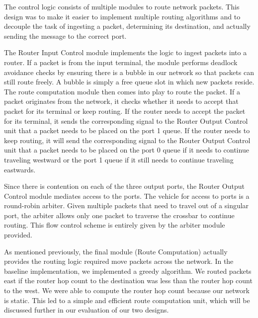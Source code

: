 \documentclass[10pt]{article}
\begin{document}
The control logic consists of multiple modules to route network packets.
This design was to make it easier to implement multiple routing algorithms
and to decouple the task of ingesting a packet, determining its destination,
and actually sending the message to the correct port. \par
The Router Input Control module implements the logic to ingest packets into
a router. 
If a packet is from the input terminal, the module performs deadlock avoidance 
checks by ensuring there is a bubble in our network so that packets can still
route freely.
A bubble is simply a free queue slot in which new packets reside.
The route computation module then comes into play to route the packet.
If a packet originates from the network, it checks whether it needs to accept
that packet for its terminal or keep routing. 
If the router needs to accept the packet for its terminal, it sends the
corresponding signal to the Router Output Control unit that a packet needs to 
be placed on the port 1 queue. 
If the router needs to keep routing, it will send the corresponding signal to
the Router Output Control unit that a packet needs to be placed on the port 0
queue if it needs to continue traveling westward or the port 1 queue if it 
still needs to continue traveling eastwards. \par

Since there is contention on each of the three output ports, the 
Router Output Control module mediates access to the ports. 
The vehicle for access to ports is a round-robin arbiter. 
Given multiple packets that need to travel out of a singular port, the arbiter
allows only one packet to traverse the crossbar to continue routing. 
This flow control scheme is entirely given by the arbiter module provided. \par

As mentioned previously, the final module (Route Computation) actually provides
the routing logic required move packets across the network.
In the baseline implementation, we implemented a greedy algorithm.
We routed packets east if the router hop count to the destination was less than
the router hop count to the west. 
We were able to compute the router hop count because our network is static. 
This led to a simple and efficient route computation unit, which will be 
discussed further in our evaluation of our two designs.
\end{document}
